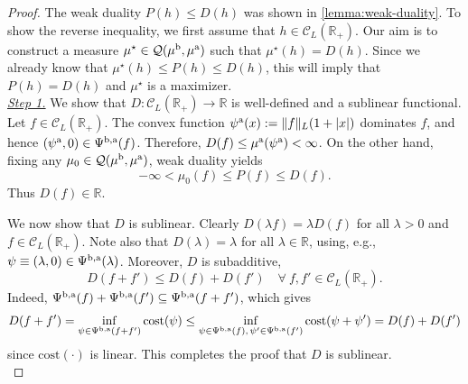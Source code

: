\documentclass[11pt]{article}
\newcommand{\cC}{\mathcal{C}}
\newcommand{\cQ}{\mathcal{Q}}
\newcommand{\R}{\mathbb{R}} %
\theoremstyle{plain}
\theoremstyle{definition}
\theoremstyle{remark}
\theoremstyle{plain}
\begin{document}
\begin{proof}%
    The weak duality $P(h)\le D(h)$ was shown in \cref{lemma:weak-duality}. To show the reverse inequality, we first assume that $h\in \cC_L(\R_+)$. Our aim is to construct a measure $\mu^{\star} \in   \cQ(\mu^{\rm{b}}, \mu^{\rm{a}}) $ such that $\mu^{\star}(h) = D(h)$. Since we already know that $\mu^{\star}(h) \le P(h)\le D(h)$, this will imply that $P(h)= D(h)$ and $\mu^{\star}$  is a maximizer. \\[-0.75em] %

\underline{\textit{Step 1.}}  
%
%
We show that $D: \cC_L(\R_+)\to \R$ is well-defined and a sublinear functional. %
Let $f\in\cC_L(\R_+)$. The convex function $\psi^{\rm a}(x):=\|f\|_L(1+|x|)$
dominates $f$, and hence $(\psi^{\rm a},0)\in\Psi^{\rm b,a}(f)$. Therefore, $D(f)\leq \mu^{\rm a}(\psi^{\rm a})<\infty$.
On the other hand, fixing any $\mu_0\in\cQ(\mu^{\rm b},\mu^{\rm a})$, weak duality yields
\[
-\infty<\mu_0(f)\leq P(f)\leq D(f).
\]
Thus $D(f)\in\R$.

We now show that $D$ is sublinear. Clearly  $D(\lambda f) = \lambda D(f)$ for all $\lambda > 0$ and $f\in \cC_L(\R_+)$. 
Note also that  $D(\lambda) = \lambda$ for all $\lambda \in \R$, using, e.g.,  $\psi \equiv (\lambda,0) \in \Psi^{\rm{b,a}}(\lambda)$. Moreover, $D$ is subadditive, 
$$D(f + f') \le D(f) + D(f') \quad \forall \ f,f' \in \cC_L(\R_+).$$ %
Indeed,  $\Psi^{\rm{b,a}}(f) + \Psi^{\rm{b,a}}(f') \subseteq \Psi^{\rm{b,a}}(f+f')$, which gives
$$D(f+f') = \inf_{\psi \in \Psi^{\rm{b,a}}(f+f')} \text{cost}(\psi) \le \inf_{\psi \in \Psi^{\rm{b,a}}(f), \,  \psi'\in\Psi^{\rm{b,a}}(f')} \text{cost}(\psi + \psi') = D(f)  +  D(f')$$
since  $\text{cost}(\cdot)$ is linear.  This completes the proof that $D$ is sublinear.  \\[-0.75em] %

%
%
%
%
%
%


\end{proof}
\end{document}
